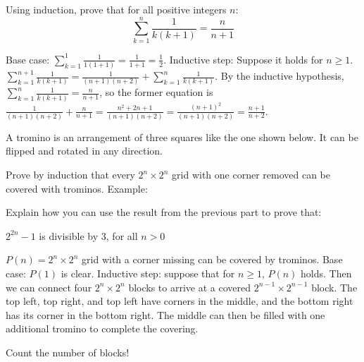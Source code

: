 \documentclass[solution, letterpaper]{cs20inclass}
\begin{document}
\problem

Using induction, prove that for all positive integers $n$:
$$
\sum_{k=1}^{n}\frac{1}{k(k+1)}=\frac{n}{n+1}
$$

\begin{solution}

Base case: $\sum_{k=1}^{1}\frac{1}{1(1+1)}=\frac{1}{1+1} = \frac{1}{2}$. Inductive step: Suppose it holds for $n \ge 1$.  $\sum_{k=1}^{n+1}\frac{1}{k(k+1)} = \frac{1}{(n+1)(n+2)} + \sum_{k=1}^{n}\frac{1}{k(k+1)}$. By the inductive hypothesis, $\sum_{k=1}^{n}\frac{1}{k(k+1)} = \frac{n}{n+1}$, so the former equation is $\frac{1}{(n+1)(n+2)} + \frac{n}{n+1} = \frac{n^2 + 2n+1}{(n+1)(n+2)} = \frac{(n+1)^2}{(n+1)(n+2)} = \frac{n+1}{n+2}$.

\end{solution}

\problem

A tromino is an arrangement of three squares like the one shown below. It can be flipped and rotated in any direction. 


\subproblem

Prove by induction that every $2^n \times 2^n$ grid with one corner removed can be covered with trominos. Example:

\begin{center}

\end{center}

\subproblem

Explain how you can use the result from the previous part to prove that: 
\begin{center}
$2^{2n}-1$ is divisible by $3$, for all $n>0$
\end{center}

\begin{solution}

\subsolution $P(n) = 2^n \times 2^n$ grid with a corner missing can be covered by trominos. Base case: $P(1)$ is clear. Inductive step: suppose that for $n \ge 1$, $P(n)$ holds. Then we can connect four $2^n \times 2^n$ blocks to arrive at a covered $2^{n-1} \times 2^{n-1}$ block. The top left, top right, and top left have corners in the middle, and the bottom right has its corner in the bottom right. The middle can then be filled with one additional tromino to complete the covering.

\subsolution Count the number of blocks!

\end{solution}
\end{document}
